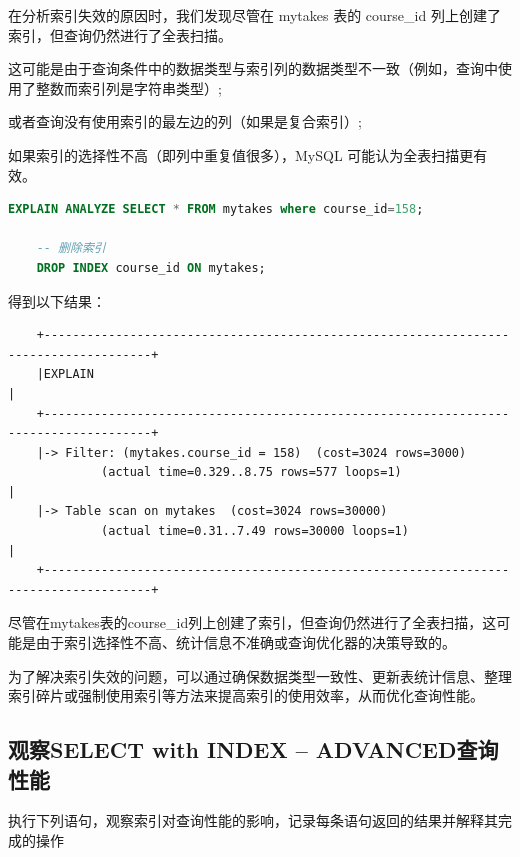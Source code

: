 \documentclass{article}
\begin{document}
	在分析索引失效的原因时，我们发现尽管在 mytakes 表的 course\_id 列上创建了索引，但查询仍然进行了全表扫描。
	
	这可能是由于查询条件中的数据类型与索引列的数据类型不一致（例如，查询中使用了整数而索引列是字符串类型）;
	
	或者查询没有使用索引的最左边的列（如果是复合索引）;
	
	如果索引的选择性不高（即列中重复值很多），MySQL 可能认为全表扫描更有效。
	
	\begin{lstlisting}[language=sql, title=索引对查询性能的影响, tabsize=4]
	EXPLAIN ANALYZE SELECT * FROM mytakes where course_id=158;
	
	-- 删除索引
	DROP INDEX course_id ON mytakes;
	\end{lstlisting}
	
	得到以下结果：
	
	\begin{verbatim}
	+-------------------------------------------------------------------------------------+
	|EXPLAIN                                                                              |
	+-------------------------------------------------------------------------------------+
	|-> Filter: (mytakes.course_id = 158)  (cost=3024 rows=3000) 
	         (actual time=0.329..8.75 rows=577 loops=1)                                   |
	|-> Table scan on mytakes  (cost=3024 rows=30000) 
	         (actual time=0.31..7.49 rows=30000 loops=1)                                  |
	+-------------------------------------------------------------------------------------+
	\end{verbatim}
	
	尽管在mytakes表的course\_id列上创建了索引，但查询仍然进行了全表扫描，这可能是由于索引选择性不高、统计信息不准确或查询优化器的决策导致的。
	
	为了解决索引失效的问题，可以通过确保数据类型一致性、更新表统计信息、整理索引碎片或强制使用索引等方法来提高索引的使用效率，从而优化查询性能。
	
	\subsection{观察SELECT with INDEX -- ADVANCED查询性能}
	
	执行下列语句，观察索引对查询性能的影响，记录每条语句返回的结果并解释其完成的操作
	
\end{document}
